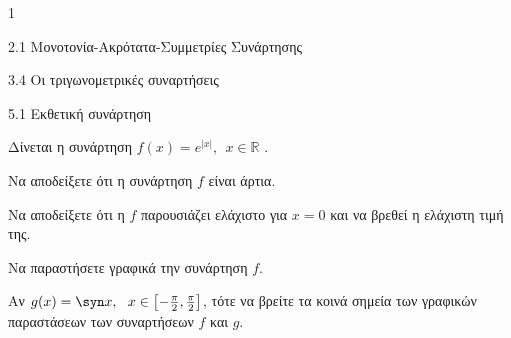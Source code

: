 \begin{ylh}{1}
\item 2.1 Μονοτονία-Ακρότατα-Συμμετρίες Συνάρτησης
\item 3.4 Οι τριγωνομετρικές συναρτήσεις
\item 5.1 Εκθετική συνάρτηση
\end{ylh}
Δίνεται η συνάρτηση $f(x) = e^{|x|},\ \ x \in \mathbb{R}$ .
\begin{alist}
\item Να αποδείξετε ότι η συνάρτηση $f$ είναι άρτια.
\item Να αποδείξετε ότι η $f$ παρουσιάζει ελάχιστο για $x = 0$ και να βρεθεί η ελάχιστη τιμή της.
\item Να παραστήσετε γραφικά την συνάρτηση $f$.
\item Αν $g(x) = \syn  x,\ \ x \in \left\lbrack - \frac{\pi}{2},\frac{\pi}{2} \right\rbrack$, τότε να βρείτε τα κοινά σημεία των γραφικών παραστάσεων των συναρτήσεων $f$ και $g$.
\end{alist}

